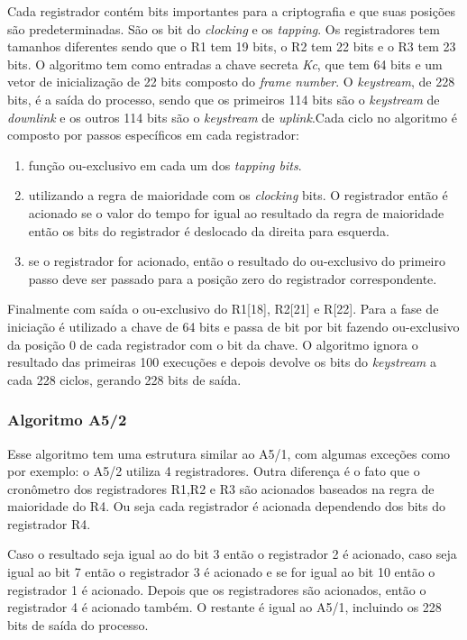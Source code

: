 Cada registrador contém bits importantes para a criptografia e que suas posições são predeterminadas. São os bit do \textit{clocking} e os \textit{tapping}. Os registradores tem tamanhos diferentes sendo que o R1 tem 19 bits, o R2 tem 22 bits e o R3 tem 23 bits. O algoritmo tem como entradas a chave secreta \textit{Kc}, que tem 64 bits e um vetor de inicialização de 22 bits composto do \textit{frame number}. O \textit{keystream}, de 228 bits, é a saída do processo, sendo que os primeiros 114 bits são o \textit{keystream} de \textit{downlink} e os outros 114 bits são o \textit{keystream} de \textit{uplink}.Cada ciclo no algoritmo é composto por passos específicos em cada registrador:

\begin{enumerate}
\item função ou-exclusivo em cada um dos \textit{tapping bits}.
\item utilizando a regra de maioridade com os \textit{clocking} bits. O registrador então é acionado se o valor do tempo for igual ao resultado da regra de maioridade então os bits do registrador é deslocado da direita para esquerda.
\item se o registrador for acionado, então o resultado do ou-exclusivo do primeiro passo deve ser passado para a posição zero do registrador correspondente.
\end{enumerate}

Finalmente com saída o ou-exclusivo do R1[18], R2[21] e R[22]. Para a fase de iniciação é utilizado a chave de 64 bits e passa de bit por bit fazendo ou-exclusivo da posição 0 de cada registrador com o bit da chave. O algoritmo ignora o resultado das primeiras 100 execuções e depois devolve os bits do \textit{keystream} a cada 228 ciclos, gerando 228 bits de saída.

\subsubsection{Algoritmo A5/2}
\label{algorithm-a52}

Esse algoritmo tem uma estrutura similar ao A5/1, com algumas exceções como por exemplo: o A5/2 utiliza 4 registradores. Outra diferença é o fato que o cronômetro dos registradores R1,R2 e R3 são acionados baseados na regra de maioridade do R4. Ou seja cada registrador é acionada dependendo dos bits do registrador R4. 

Caso o resultado seja igual ao do bit 3 então o registrador 2 é acionado, caso seja igual ao bit 7 então o registrador 3 é acionado e se for igual ao bit 10 então o registrador 1 é acionado. Depois que os registradores são acionados, então o registrador 4 é acionado também. O restante é igual ao A5/1, incluindo os 228 bits de saída do processo.
